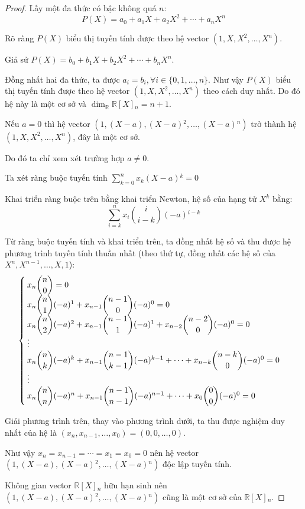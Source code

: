 \documentclass[class=linearalgebra,crop=false]{standalone}
\begin{document}
\begin{proof}Lấy một đa thức có bậc không quá $n$:
    \[ P(X) = a_{0} + a_{1}X + a_{2}X^{2} + \cdots + a_{n}X^{n} \]
    \par Rõ ràng $P(X)$ biểu thị tuyến tính được theo hệ vector $(1, X, X^{2}, \ldots, X^{n})$.
    \par Giả sử $P(X) = b_{0} + b_{1}X + b_{2}X^{2} + \cdots + b_{n}X^{n}$.
    \par Đồng nhất hai đa thức, ta được $a_{i} = b_{i}, \forall i\in\{0, 1, \ldots, n\}$. Như vậy $P(X)$ biểu thị tuyến tính được theo hệ vector $(1, X, X^{2}, \ldots, X^{n})$ theo cách duy nhất. Do đó hệ này là một cơ sở và $\dim_{\mathbb{R}}\mathbb{R}[X]{}_{n} = n + 1$.

    \par Nếu $a = 0$ thì hệ vector $(1, (X - a), (X - a){}^{2}, \ldots, (X - a){}^{n})$ trở thành hệ $(1, X, X^{2}, \ldots, X^{n})$, đây là một cơ sở.
    \par Do đó ta chỉ xem xét trường hợp $a\ne 0$.
    \par Ta xét ràng buộc tuyến tính $\displaystyle\sum^{n}_{k=0}x_{k}(X-a){}^{k} = 0$
    \par Khai triển ràng buộc trên bằng khai triển Newton, hệ số của hạng tử $X^{k}$ bằng:
    \[ \sum^{n}_{i=k}x_{i}\binom{i}{i-k}(-a){}^{i-k} \]
    \par Từ ràng buộc tuyến tính và khai triển trên, ta đồng nhất hệ số và thu được hệ phương trình tuyến tính thuần nhất (theo thứ tự, đồng nhất các hệ số của $X^{n}, X^{n-1}, \ldots, X, 1$):
    \[
        \begin{cases}
            x_{n}\dbinom{n}{0} = 0 \\
            x_{n}\dbinom{n}{1}(-a){}^{1} + x_{n-1}\dbinom{n-1}{0}(-a){}^{0} = 0 \\
            x_{n}\dbinom{n}{2}(-a){}^{2} + x_{n-1}\dbinom{n-1}{1}(-a){}^{1} + x_{n-2}\dbinom{n-2}{0}(-a){}^{0} = 0 \\
            \vdots \\
            x_{n}\dbinom{n}{k}(-a){}^{k} + x_{n-1}\dbinom{n-1}{k-1}(-a){}^{k-1} + \cdots + x_{n-k}\dbinom{n-k}{0}(-a){}^{0} = 0 \\
            \vdots \\
            x_{n}\dbinom{n}{n}(-a){}^{n} + x_{n-1}\dbinom{n-1}{n-1}(-a){}^{n-1} + \cdots + x_{0}\dbinom{0}{0}(-a){}^{0} = 0
        \end{cases}
    \]
    \par Giải phương trình trên, thay vào phương trình dưới, ta thu được nghiệm duy nhất của hệ là $(x_{n}, x_{n-1},\ldots, x_{0}) = (0,0,\ldots, 0)$.
    \par Như vậy $x_{n} = x_{n-1} = \cdots = x_{1} = x_{0} = 0$ nên hệ vector $(1, (X - a), (X - a){}^{2}, \ldots, (X - a){}^{n})$ độc lập tuyến tính.
    \par Không gian vector $\mathbb{R}[X]{}_{n}$ hữu hạn sinh nên $(1, (X-a), (X-a){}^{2},\ldots, (X-a){}^{n})$ cũng là một cơ sở của $\mathbb{R}[X]{}_{n}$.


\end{proof}
\end{document}
